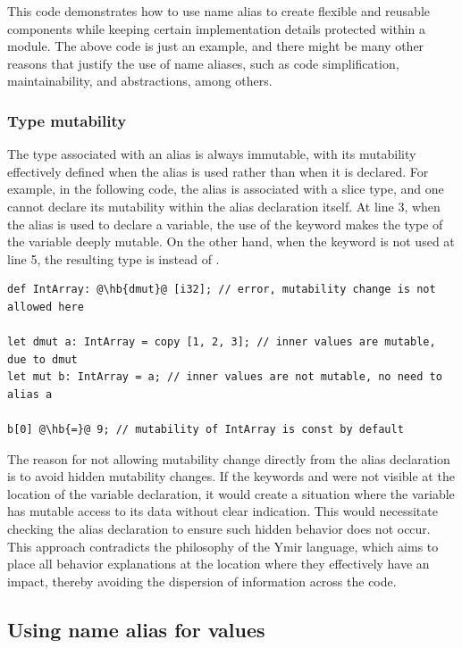 This code demonstrates how to use name alias to create flexible and reusable
components while keeping certain implementation details protected within a
module. The above code is just an example, and there might be many other reasons
that justify the use of name aliases, such as code simplification,
maintainability, and abstractions, among others.

\subsubsection*{Type mutability}

The type associated with an alias is always immutable, with its mutability
effectively defined when the alias is used rather than when it is declared. For
example, in the following code, the alias  is associated with a
\token{[i32]} slice type, and one cannot declare its mutability within the alias
declaration itself. At line 3, when the alias  is used to
declare a variable, the use of the keyword  makes the type of the
variable deeply mutable. On the other hand, when the keyword  is not
used at line 5, the resulting type is  instead of .

\begin{lstlisting}[style=coloredverbatimError, escapechar=@]
def IntArray: @\hb{dmut}@ [i32]; // error, mutability change is not allowed here

let dmut a: IntArray = copy [1, 2, 3]; // inner values are mutable, due to dmut
let mut b: IntArray = a; // inner values are not mutable, no need to alias a

b[0] @\hb{=}@ 9; // mutability of IntArray is const by default
\end{lstlisting}

The reason for not allowing mutability change directly from the alias
declaration is to avoid hidden mutability changes. If the keywords 
and  were not visible at the location of the variable declaration,
it would create a situation where the variable has mutable access to its data
without clear indication. This would necessitate checking the alias declaration
to ensure such hidden behavior does not occur. This approach contradicts the
philosophy of the Ymir language, which aims to place all behavior explanations
at the location where they effectively have an impact, thereby avoiding the
dispersion of information across the code.

\subsection{Using name alias for values}

